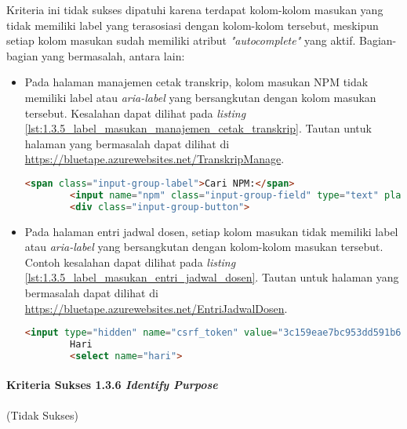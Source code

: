 Kriteria ini tidak sukses dipatuhi karena terdapat kolom-kolom masukan yang tidak memiliki label yang terasosiasi dengan kolom-kolom tersebut, meskipun setiap kolom masukan sudah memiliki atribut \textit{"autocomplete"} yang aktif. Bagian-bagian yang bermasalah, antara lain:
\begin{itemize}
    \item Pada halaman manajemen cetak transkrip, kolom masukan NPM tidak memiliki label atau \textit{aria-label} yang bersangkutan dengan kolom masukan tersebut. Kesalahan dapat dilihat pada \textit{listing} \ref{lst:1.3.5_label_masukan_manajemen_cetak_transkrip}. Tautan untuk halaman yang bermasalah dapat dilihat di \url{https://bluetape.azurewebsites.net/TranskripManage}.
    \begin{lstlisting}[frame=single, label={lst:1.3.5_label_masukan_manajemen_cetak_transkrip}, language=HTML, caption=Kriteria Sukses 1.3.5 - Tidak Terdapat Label pada Kolom Masukan di Halaman Manajemen Cetak Transkrip]
        <span class="input-group-label">Cari NPM:</span>
        <input name="npm" class="input-group-field" type="text" placeholder="2013730013" maxlength="10" minlength="10"/>
        <div class="input-group-button">
    \end{lstlisting}
    
    \item Pada halaman entri jadwal dosen, setiap kolom masukan tidak memiliki label atau \textit{aria-label} yang bersangkutan dengan kolom-kolom masukan tersebut. Contoh kesalahan dapat dilihat pada \textit{listing} \ref{lst:1.3.5_label_masukan_entri_jadwal_dosen}. Tautan untuk halaman yang bermasalah dapat dilihat di \url{https://bluetape.azurewebsites.net/EntriJadwalDosen}.
    \begin{lstlisting}[frame=single, label={lst:1.3.5_label_masukan_entri_jadwal_dosen}, language=HTML, caption=Kriteria Sukses 1.3.5 - Tidak Terdapat Label pada Kolom Masukan di Halaman Entri Jadwal Dosen]
        <input type="hidden" name="csrf_token" value="3c159eae7bc953dd591b679c080ed066" />
        Hari
        <select name="hari">
    \end{lstlisting}
\end{itemize}

\paragraph{Kriteria Sukses 1.3.6 \textit{Identify Purpose}}
\label{par:kepatuhan_bluetape_kriteria_sukses_1.3.6}
(Tidak Sukses)\\

